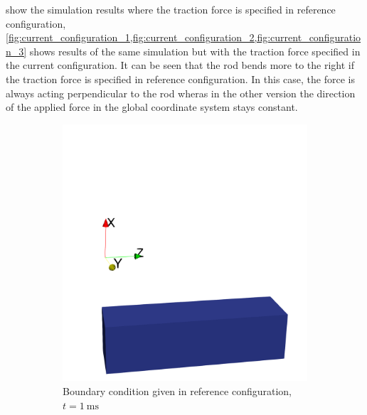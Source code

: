  show the simulation results where the traction force is specified in reference configuration, \cref{fig:current_configuration_1,fig:current_configuration_2,fig:current_configuration_3} shows results of the same simulation but with the traction force specified in the current configuration.
It can be seen that the rod bends more to the right if the traction force is specified in reference configuration. In this case, the force is always acting perpendicular to the rod wheras in the other version the direction of the applied force in the global coordinate system stays constant.

\begin{figure}%
  \centering%
  \begin{subfigure}[t]{0.31\textwidth}%
    \centering%
    \includegraphics[width=\textwidth]{images/implementation/current_configuration_1_cropped.png}
    \caption{Boundary condition given in reference configuration, $t=\SI{1}{\milli\second}$}%
    \label{fig:reference_configuration_1}%
  \end{subfigure}
  \quad
  \begin{subfigure}[t]{0.31\textwidth}%
    \centering%

\end{subfigure}
\end{figure}

